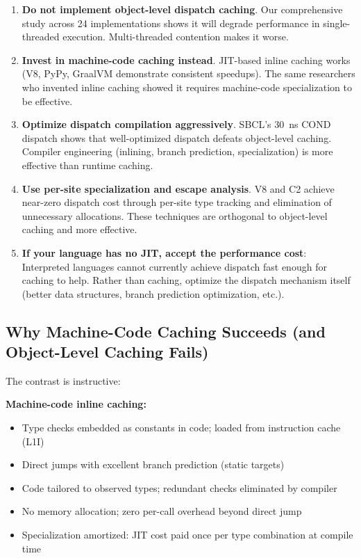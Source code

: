 \documentclass[sigplan,final,acmsmall,review,screen]{acmart}
\begin{document}
\begin{enumerate}
  \item \textbf{Do not implement object-level dispatch caching}. Our comprehensive study across 24 implementations
    shows it will degrade performance in single-threaded execution. Multi-threaded contention makes it worse.

  \item \textbf{Invest in machine-code caching instead}. JIT-based inline caching works (V8, PyPy, GraalVM demonstrate consistent speedups).
    The same researchers who invented inline caching showed it requires machine-code specialization to be effective.

  \item \textbf{Optimize dispatch compilation aggressively}. SBCL's 30~ns COND dispatch shows that well-optimized dispatch defeats object-level caching.
    Compiler engineering (inlining, branch prediction, specialization) is more effective than runtime caching.

  \item \textbf{Use per-site specialization and escape analysis}. V8 and C2 achieve near-zero dispatch cost through per-site type tracking and
    elimination of unnecessary allocations. These techniques are orthogonal to object-level caching and more effective.

  \item \textbf{If your language has no JIT, accept the performance cost}: Interpreted languages cannot currently achieve dispatch fast enough for caching to help.
    Rather than caching, optimize the dispatch mechanism itself (better data structures, branch prediction optimization, etc.).
\end{enumerate}

\subsection{Why Machine-Code Caching Succeeds (and Object-Level Caching Fails)}

The contrast is instructive:

\textbf{Machine-code inline caching:}
\begin{itemize}
  \item Type checks embedded as constants in code; loaded from instruction cache (L1I)
  \item Direct jumps with excellent branch prediction (static targets)
  \item Code tailored to observed types; redundant checks eliminated by compiler
  \item No memory allocation; zero per-call overhead beyond direct jump
  \item Specialization amortized: JIT cost paid once per type combination at compile time
\end{itemize}
\end{document}
